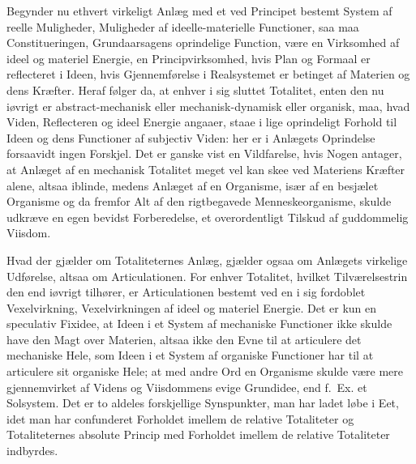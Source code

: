 \documentclass[12pt]{book}
\newcommand{\opage}[1]{\marginnote{\footnotesize\textit{[#1]}}}
\begin{document}
\opage{398} Begynder nu ethvert virkeligt Anlæg med et ved Principet bestemt System af reelle Muligheder,
Muligheder af ideelle-materielle Functioner, saa maa Constitueringen, Grundaarsagens
oprindelige Function, være en Virksomhed af ideel og materiel Energie, en Principvirksomhed,
hvis Plan og Formaal er reflecteret i Ideen, hvis Gjennemførelse i Realsystemet er betinget af
Materien og dens Kræfter. Heraf følger da, at enhver i sig sluttet Totalitet, enten den nu
iøvrigt er abstract-mechanisk eller mechanisk-dynamisk eller organisk, maa, hvad Viden,
Reflecteren og ideel Energie angaaer, staae i lige oprindeligt Forhold til Ideen og dens
Functioner af subjectiv Viden: her er i Anlægets Oprindelse forsaavidt ingen Forskjel. Det er
ganske vist en Vildfarelse, hvis Nogen antager, at Anlæget af en mechanisk Totalitet meget vel
kan skee ved Materiens Kræfter alene, altsaa iblinde, medens Anlæget af en Organisme, især af
en besjælet Organisme og da fremfor Alt af den rigtbegavede Menneskeorganisme, skulde udkræve
en egen bevidst Forberedelse, et overordentligt Tilskud af guddommelig Viisdom.

Hvad der gjælder om Totaliteternes Anlæg, gjælder ogsaa om Anlægets virkelige Udførelse, altsaa
om Articulationen. For enhver Totalitet, hvilket Tilværelsestrin den end iøvrigt tilhører, er
Articulationen bestemt ved en i sig fordoblet Vexelvirkning, Vexelvirkningen af ideel og
materiel Energie. Det er kun en speculativ Fixidee, at Ideen i et System af mechaniske
Functioner ikke skulde have den Magt over Materien, altsaa ikke den Evne til at articulere det
mechaniske Hele, som Ideen i et System af organiske Functioner har til at articulere sit
organiske Hele; at med andre Ord en Organisme skulde være mere gjennemvirket af Videns og
Viisdommens evige Grundidee, end f.\ Ex. et Solsystem. Det er to aldeles forskjellige
Synspunkter, man har ladet løbe i Eet, idet man har confunderet Forholdet imellem de relative
Totaliteter og
\opage{399} Totaliteternes absolute Princip med Forholdet imellem de relative Totaliteter indbyrdes.
\end{document}
